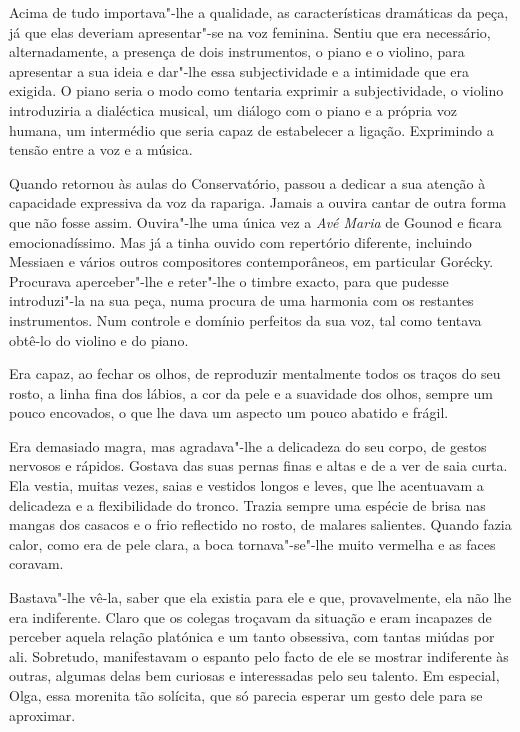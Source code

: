 Acima de tudo importava"-lhe a qualidade, as características dramáticas
da peça, já que elas deveriam apresentar"-se na voz feminina. Sentiu que
era necessário, alternadamente, a presença de dois instrumentos, o piano
e o violino, para apresentar a sua ideia e dar"-lhe essa subjectividade e
a intimidade que era exigida. O piano seria o modo como tentaria
exprimir a subjectividade, o violino introduziria a dialéctica musical,
um diálogo com o piano e a própria voz humana, um intermédio que seria
capaz de estabelecer a ligação. Exprimindo a tensão entre a voz e a
música.

Quando retornou às aulas do Conservatório, passou a dedicar a sua
atenção à capacidade expressiva da voz da rapariga. Jamais a ouvira
cantar de outra forma que não fosse assim. Ouvira"-lhe uma única vez a
\emph{Avé Maria} de Gounod e ficara emocionadíssimo. Mas já a tinha
ouvido com repertório diferente, incluindo Messiaen e vários outros
compositores contemporâneos, em particular Gorécky. Procurava
aperceber"-lhe e reter"-lhe o timbre exacto, para que pudesse introduzi"-la
na sua peça, numa procura de uma harmonia com os restantes instrumentos.
Num controle e domínio perfeitos da sua voz, tal como tentava obtê-lo do
violino e do piano.

Era capaz, ao fechar os olhos, de reproduzir mentalmente todos os traços
do seu rosto, a linha fina dos lábios, a cor da pele e a suavidade dos
olhos, sempre um pouco encovados, o que lhe dava um aspecto um pouco
abatido e frágil.

Era demasiado magra, mas agradava"-lhe a delicadeza do seu corpo, de
gestos nervosos e rápidos. Gostava das suas pernas finas e altas e de a
ver de saia curta. Ela vestia, muitas vezes, saias e vestidos longos e
leves, que lhe acentuavam a delicadeza e a flexibilidade do tronco.
Trazia sempre uma espécie de brisa nas mangas dos casacos e o frio
reflectido no rosto, de malares salientes. Quando fazia calor, como era
de pele clara, a boca tornava"-se"-lhe muito vermelha e as faces coravam.

Bastava"-lhe vê-la, saber que ela existia para ele e que, provavelmente,
ela não lhe era indiferente. Claro que os colegas troçavam da situação e
eram incapazes de perceber aquela relação platónica e um tanto
obsessiva, com tantas miúdas por ali. Sobretudo, manifestavam o espanto
pelo facto de ele se mostrar indiferente às outras, algumas delas bem
curiosas e interessadas pelo seu talento. Em especial, Olga, essa
morenita tão solícita, que só parecia esperar um gesto dele para se
aproximar.

